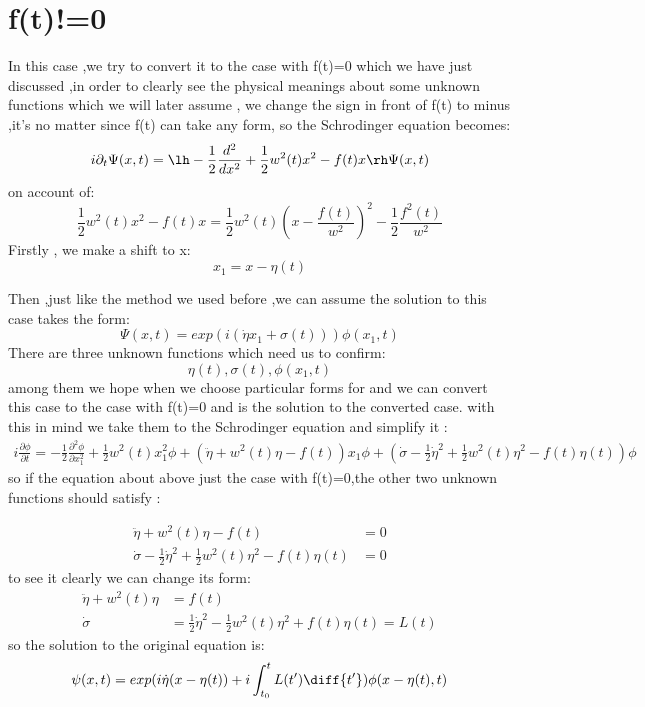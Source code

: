 \section{f(t)!=0}
\begin{frame}
In this case ,we try to convert it to the case with f(t)=0 which we have just discussed ,in order to clearly see the physical meanings about some unknown functions which we will later assume , we change the sign in front of f(t) to minus ,it’s no matter since f(t) can take any form, so the Schrodinger  equation becomes:
\begin{align*}
i\partial_t \Psi(x,t)=\lh-\frac{1}{2}\frac{d^2}{dx^2}+\frac{1}{2}w^2(t)x^2-f(t)x\rh\Psi(x,t)
\end{align*}
on account of:
\[\frac{1}{2}w^2(t)x^2-f(t)x=\frac{1}{2}w^2(t)(x-\frac{f(t)}{w^2})^2-\frac{1}{2}\frac{f^2(t)}{w^2}\]
Firstly , we make a shift to x:
\[x_1=x-\eta(t)\]
\end{frame}
\begin{frame}
Then ,just like the method we used before ,we can assume the solution to this case takes the form:
\[\Psi(x,t)=exp(i(\dot{\eta}x_1+\sigma(t)))\phi(x_1,t)\]
There are three unknown functions which need us to confirm:
\[\eta(t),\sigma(t),\phi(x_1,t)\]
among them we hope  when we choose particular forms for and  we can convert this case to the case with f(t)=0 and is the solution to the converted case. with this in mind we take them to the Schrodinger equation and simplify it :
\begin{align*}
i\frac{\partial \phi}{\partial t}=-\frac{1}{2}\frac{\partial ^2\phi}{\partial x_1^2}+\frac{1}{2}w^2(t)x_1^2\phi+(\ddot{\eta}+w^2(t)\eta-f(t))x_1\phi+(\dot{\sigma}-\frac{1}{2}\dot{\eta}^2+\frac{1}{2}w^2(t)\eta^2-f(t)\eta(t))\phi
\end{align*}
so if the equation about  above just  the case with f(t)=0,the other two unknown functions should satisfy :
\end{frame}
\begin{frame}
\begin{align*}
\ddot{\eta}+w^2(t)\eta-f(t)&=0\\
\dot{\sigma}-\frac{1}{2}\dot{\eta}^2+\frac{1}{2}w^2(t)\eta^2-f(t)\eta(t)&=0
\end{align*}
to see it clearly we can change its form:
\begin{align*}
\ddot{\eta}+w^2(t)\eta&=f(t)\\
\dot{\sigma}&=\frac{1}{2}\dot{\eta}^2-\frac{1}{2}w^2(t)\eta^2+f(t)\eta(t)=L(t)
\end{align*}
so the solution to the original equation is:
\begin{align*}
\psi(x,t)=exp(i\dot{\eta}(x-\eta(t))+i\int_{t_0}^t L(t')\diff{t'})\phi(x-\eta(t),t)
\end{align*}
\end{frame}
